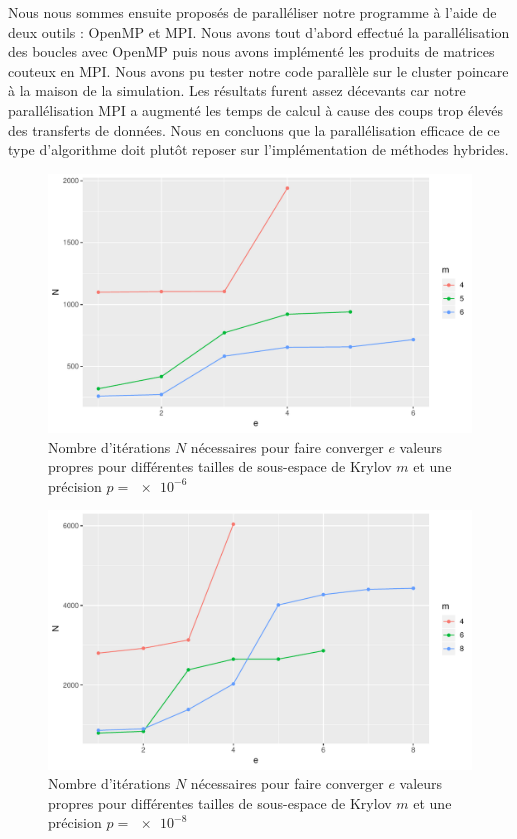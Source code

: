 \documentclass[11pt,a4paper]{article}
\begin{document}
	Nous nous sommes ensuite proposés de paralléliser notre programme à l'aide de deux outils : OpenMP et MPI. Nous avons tout d'abord effectué la parallélisation des boucles avec OpenMP puis nous avons implémenté les produits de matrices couteux en MPI. Nous avons pu tester notre code parallèle sur le cluster poincare à la maison de la simulation. Les résultats furent assez décevants car notre parallélisation MPI a augmenté les temps de calcul à cause des coups trop élevés des transferts de données. Nous en concluons que la parallélisation efficace de ce type d'algorithme doit plutôt reposer sur l'implémentation de méthodes hybrides.


\begin{figure}
	\centering
	\includegraphics[width=0.8\linewidth, keepaspectratio]{plots/Nvse-m_p6.pdf}
	\caption{Nombre d'itérations $N$ nécessaires pour faire converger $e$ valeurs propres pour différentes tailles de sous-espace de Krylov $m$ et une précision $p=\SI{e-6}{}$ \label{fig:Nvse-m_p6}}
\end{figure}

\begin{figure}
	\centering
	\includegraphics[width=0.8\linewidth, keepaspectratio]{plots/Nvse-m_p8.pdf}
	\caption{Nombre d'itérations $N$ nécessaires pour faire converger $e$ valeurs propres pour différentes tailles de sous-espace de Krylov $m$ et une précision $p=\SI{e-8}{}$ \label{fig:Nvse-m_p8}}
\end{figure}
\end{document}
